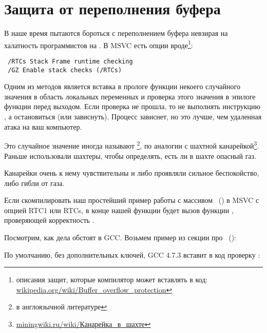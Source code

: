 \section{Защита от переполнения буфера}
\label{subsec:BO_protection}

В наше время пытаются бороться с переполнением буфера невзирая на халатность программистов на \CCpp. 
В MSVC есть опции вроде\footnote{описания защит, которые компилятор может вставлять в код:
\href{http://go.yurichev.com/17133}{wikipedia.org/wiki/Buffer\_overflow\_protection}}:

\begin{lstlisting}
 /RTCs Stack Frame runtime checking
 /GZ Enable stack checks (/RTCs)
\end{lstlisting}

Одним из методов является вставка в прологе функции некоего случайного значения в область локальных переменных 
и проверка этого значения в эпилоге функции перед выходом. 
Если проверка не прошла, то не выполнять инструкцию \RET, а остановиться (или зависнуть). 
Процесс зависнет, но это лучше, чем удаленная атака на ваш компьютер.

\newcommand{\CANARYURL}{\href{http://go.yurichev.com/17135}{miningwiki.ru/wiki/Канарейка\_в\_шахте}}

Это случайное значение иногда называют 
\footnote{ в англоязычной литературе}, 
по аналогии с шахтной канарейкой\footnote{\CANARYURL}.
Раньше использовали шахтеры, чтобы определять, есть ли в шахте опасный газ.

Канарейки очень к нему чувствительны и либо проявляли сильное беспокойство, либо гибли от газа.

Если скомпилировать наш простейший пример работы с массивом ~() в \ac{MSVC}
с опцией RTC1 или RTCs, в конце нашей функции будет вызов функции
, проверяющей корректность .

Посмотрим, как дела обстоят в GCC. 
Возьмем пример из секции про ~():



По умолчанию, без дополнительных ключей, GCC 4.7.3 вставит в код проверку :




